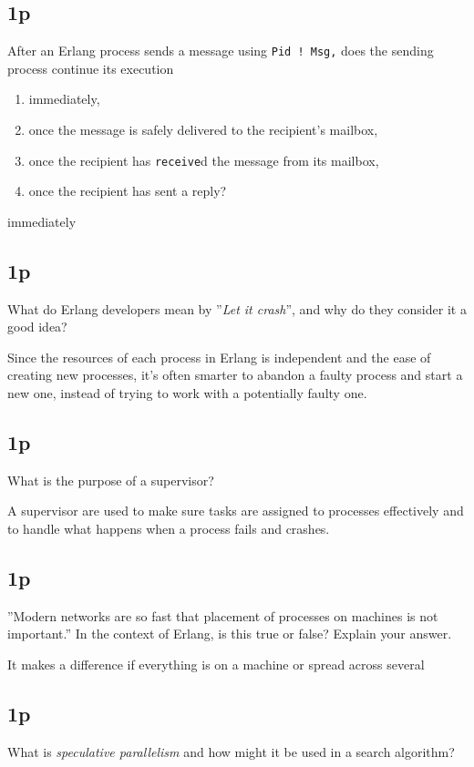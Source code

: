 \subsection{1p}
After an Erlang process sends a message using \lstinline{Pid ! Msg,} does the sending process continue its execution \begin{enumerate}[i]
\item immediately,
\item once the message is safely delivered to the recipient's mailbox,
\item once the recipient has \lstinline{receive}d the message from its mailbox,
\item once the recipient has sent a reply?
\end{enumerate}

immediately

\subsection{1p}
What do Erlang developers mean by ''\textit{Let it crash}'', and why do they consider it a good idea?

Since the resources of each process in Erlang is independent and the ease of creating new processes, it's often smarter to abandon a faulty process and start a new one, instead of trying to work with a potentially faulty one.

\subsection{1p}
What is the purpose of a supervisor?

A supervisor are used to make sure tasks are assigned to processes effectively and to handle what happens when a process fails and crashes.

\subsection{1p}
''Modern networks are so fast that placement of processes on machines is not important.'' In the context of Erlang, is this true or false? Explain your answer.

It makes a difference if everything is on a machine or spread across several

\subsection{1p}
What is \textit{speculative parallelism} and how might it be used in a search algorithm?

